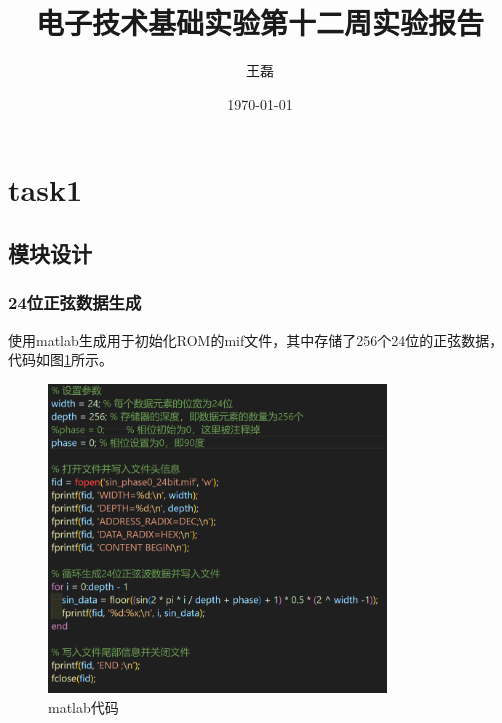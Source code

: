\documentclass[UTF8]{ctexart}
\title{电子技术基础实验第十二周实验报告}
\author{王磊\quad2022012972}
\date{\today}
\begin{document}
\maketitle
\section{task1}
\subsection{模块设计}
\subsubsection{24位正弦数据生成}
使用matlab生成用于初始化ROM的mif文件，其中存储了256个24位的正弦数据，代码如图\ref{fig:matlab_code}所示。
\begin{figure}[!ht]
    \centering
    \includegraphics[width=0.8\textwidth]{matlab_code.png}
    \caption{matlab代码}
    \label{fig:matlab_code}
\end{figure}
\end{document}
